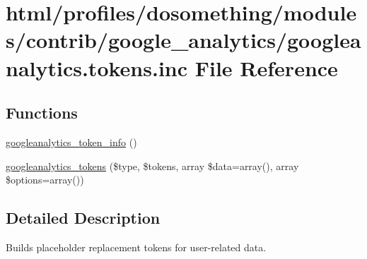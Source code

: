 \hypertarget{googleanalytics_8tokens_8inc}{
\section{html/profiles/dosomething/modules/contrib/google\_\-analytics/googleanalytics.tokens.inc File Reference}
\label{googleanalytics_8tokens_8inc}
}
\subsection*{Functions}
\begin{DoxyCompactItemize}
\item 
\hyperlink{googleanalytics_8tokens_8inc_a41f3ed09246b0dd2e51f1e41d604af24}{googleanalytics\_\-token\_\-info} ()
\item 
\hyperlink{googleanalytics_8tokens_8inc_a7ab13afdbf75bfe40bce385f6cfeed87}{googleanalytics\_\-tokens} (\$type, \$tokens, array \$data=array(), array \$options=array())
\end{DoxyCompactItemize}


\subsection{Detailed Description}
Builds placeholder replacement tokens for user-\/related data. 

